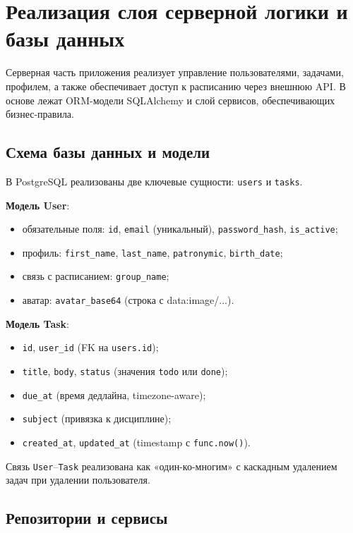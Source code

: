 \section{Реализация слоя серверной логики и базы данных}

Серверная часть приложения реализует управление пользователями, задачами, профилем, а также обеспечивает доступ к расписанию через внешнюю API. В основе лежат ORM-модели SQLAlchemy и слой сервисов, обеспечивающих бизнес-правила.

\subsection{Схема базы данных и модели}

В PostgreSQL реализованы две ключевые сущности: \texttt{users} и \texttt{tasks}.

\textbf{Модель User}:
\begin{itemize}
    \item обязательные поля: \texttt{id}, \texttt{email} (уникальный), \texttt{password\_hash}, \texttt{is\_active};
    \item профиль: \texttt{first\_name}, \texttt{last\_name}, \texttt{patronymic}, \texttt{birth\_date};
    \item связь с расписанием: \texttt{group\_name};
    \item аватар: \texttt{avatar\_base64} (строка с data:image/...).
\end{itemize}

\textbf{Модель Task}:
\begin{itemize}
    \item \texttt{id}, \texttt{user\_id} (FK на \texttt{users.id});
    \item \texttt{title}, \texttt{body}, \texttt{status} (значения \texttt{todo} или \texttt{done});
    \item \texttt{due\_at} (время дедлайна, timezone-aware);
    \item \texttt{subject} (привязка к дисциплине);
    \item \texttt{created\_at}, \texttt{updated\_at} (timestamp с \texttt{func.now()}).
\end{itemize}

Связь \texttt{User}--\texttt{Task} реализована как «один-ко-многим» с каскадным удалением задач при удалении пользователя.

\subsection{Репозитории и сервисы}


